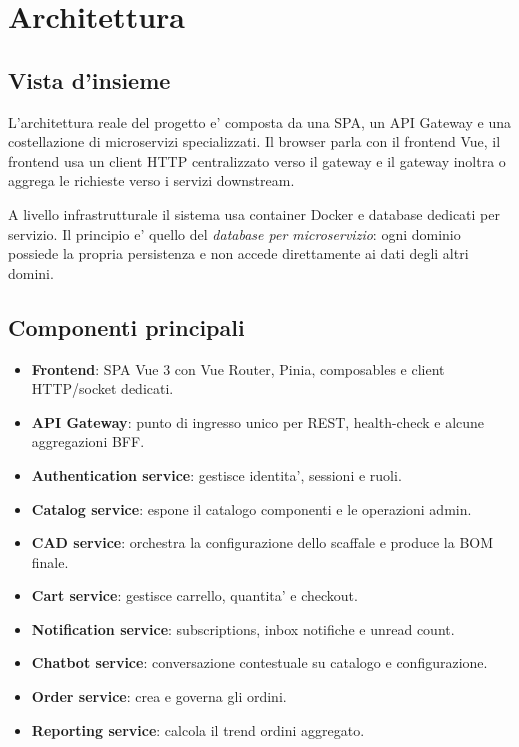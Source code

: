 \chapter{Architettura}

\section{Vista d'insieme}

L'architettura reale del progetto e' composta da una SPA, un API Gateway e una costellazione di microservizi specializzati. Il browser parla con il frontend Vue, il frontend usa un client HTTP centralizzato verso il gateway e il gateway inoltra o aggrega le richieste verso i servizi downstream.

A livello infrastrutturale il sistema usa container Docker e database dedicati per servizio. Il principio e' quello del \emph{database per microservizio}: ogni dominio possiede la propria persistenza e non accede direttamente ai dati degli altri domini.

\section{Componenti principali}

\begin{itemize}
\item \textbf{Frontend}: SPA Vue 3 con Vue Router, Pinia, composables e client HTTP/socket dedicati.
\item \textbf{API Gateway}: punto di ingresso unico per REST, health-check e alcune aggregazioni BFF.
\item \textbf{Authentication service}: gestisce identita', sessioni e ruoli.
\item \textbf{Catalog service}: espone il catalogo componenti e le operazioni admin.
\item \textbf{CAD service}: orchestra la configurazione dello scaffale e produce la BOM finale.
\item \textbf{Cart service}: gestisce carrello, quantita' e checkout.
\item \textbf{Notification service}: subscriptions, inbox notifiche e unread count.
\item \textbf{Chatbot service}: conversazione contestuale su catalogo e configurazione.
\item \textbf{Order service}: crea e governa gli ordini.
\item \textbf{Reporting service}: calcola il trend ordini aggregato.
\end{itemize}

